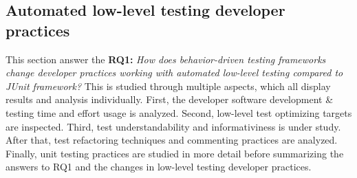 \subsection{Automated low-level testing developer practices}
This section answer the
\textbf{RQ1: }\textit{How does behavior-driven testing frameworks change developer practices working with automated
low-level testing compared to JUnit framework?} This is studied through multiple aspects, which all display results and analysis
individually. First, the developer software development \& testing time and effort usage is analyzed. Second, low-level
test optimizing targets are inspected. Third, test understandability and informativiness is under study. After that, test
refactoring techniques and commenting practices are analyzed. Finally, unit testing practices are studied in more detail
before summarizing the answers to RQ1 and the changes in low-level testing developer practices.

